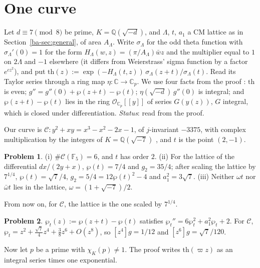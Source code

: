 \documentclass[reqno]{amsart}
\theoremstyle{plain}
\theoremstyle{definition}
\newtheorem{problem}{Problem}[section]
\theoremstyle{remark}
\newcommand{\Q}{\mathbb{Q}}
\newcommand{\C}{\mathbb{C}}
\newcommand{\F}{\mathbb{F}}
\newcommand{\Op}{\mathcal{O}_{\C_p}}
\newcommand{\tth}{\mathrm{th}}
\begin{document}
\section{One curve}\label{sec:curve}

Let \(d \equiv 7 \pmod 8\) be prime, \(K = \Q(\sqrt{-d})\), and \(\Lambda\), \(t\), \(a_1\) a CM lattice as in Section~\ref{ba-sec:general}, of area \(A_\Lambda\).  Write \(\sigma_\Lambda\) for the odd theta function with \(\sigma_\Lambda'(0) = 1\) for the form \(H_\Lambda(w, z) = (\pi/A_\Lambda)\bar w z\) and the multiplier equal to \(1\) on \(2\Lambda\) and \(-1\) elsewhere (it differs from Weierstrass' sigma function by a factor \(e^{cz^2}\)), and put \(\tth(z) := \exp(-H_\Lambda(t, z))\,\sigma_\Lambda(z+t)/\sigma_\Lambda(t)\).  Read its Taylor series through a ring map \(\eta\colon \C \to \C_p\).  We use four facts from the proof \cite{GL}: \(\tth\) is even; \(g'' = g''(0) + \wp(z+t) - \wp(t)\); \(\eta(\sqrt{-d})\, g''(0)\) is integral; and \(\wp(z+t) - \wp(t)\) lies in the ring \(\Op[[y]]\) of series \(G(y(z))\), \(G\) integral, which is closed under differentiation.  \emph{Status}: read from the proof.

Our curve is \(\mathcal C\colon y^2 + xy = x^3 - x^2 - 2x - 1\), of \(j\)-invariant \(-3375\), with complex multiplication by the integers of \(K = \Q(\sqrt{-7})\) \cite[App.~A, \S3]{ATAEC}, and \(t\) is the point \((2,-1)\).

\begin{problem}\label{pr:curve}
(i) \(\#\mathcal C(\F_5) = 6\), and \(t\) has order \(2\).  (ii) For the lattice of the differential \(dx/(2y + x)\), \(\wp(t) = 7/4\) and \(g_2 = 35/4\); after scaling the lattice by \(7^{1/4}\), \(\wp(t) = \sqrt7/4\), \(g_2 = 5/4 = 12\wp(t)^2 - 4\) and \(a_1^2 = 3\sqrt7\).  (iii) Neither \(\omega t\) nor \(\bar\omega t\) lies in the lattice, \(\omega = (1+\sqrt{-7})/2\).
\end{problem}

From now on, for \(\mathcal C\), the lattice is the one scaled by \(7^{1/4}\).

\begin{problem}\label{pr:g-coeff}
\(\wp_t(z) := \wp(z+t) - \wp(t)\) satisfies \(\wp_t'' = 6\wp_t^2 + a_1^2 \wp_t + 2\).  For \(\mathcal C\), \(\wp_t = z^2 + \tfrac{\sqrt7}{4} z^4 + \tfrac38 z^6 + O(z^8)\), so \([z^4]g = 1/12\) and \([z^6]g = \sqrt7/120\).
\end{problem}

Now let \(p\) be a prime with \(\chi_K(p) \ne 1\).  The proof writes \(\tth(\varpi z)\) as an integral series times one exponential.
\end{document}
